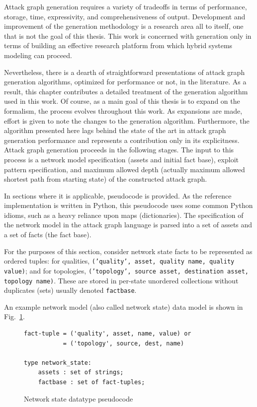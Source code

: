 Attack graph generation requires a variety of tradeoffs in terms of performance,
storage, time, expressivity, and comprehensiveness of output. Development and
improvement of the generation methodology is a research area all to itself, one
that is not the goal of this thesis. This work is concerned with generation only
in terms of building an effective research platform from which hybrid systems
modeling can proceed.

Nevertheless, there is a dearth of straightforward presentations of attack 
graph generation algorithms, optimized for performance or not, in the 
literature. As a result, this chapter contributes a detailed treatment of the
generation algorithm used in this work. Of course, as a main goal of this
thesis is to expand on the formalism, the process evolves throughout this
work. As expansions are made, effort is given to note the changes to the
generation algorithm. Furthermore, the algorithm presented here lags behind the
state of the art in attack graph generation performance and represents a
contribution only in its explicitness.
Attack graph generation proceeds in the following stages. The input to this
process is a network model specification (assets and initial fact base),
exploit pattern specification, and maximum allowed depth (actually maximum
allowed shortest path from starting state) of the constructed attack graph.

In sections where it is applicable, pseudocode is provided. As the reference
implementation is written in Python, this pseudocode uses some common Python
idioms, such as a heavy reliance upon maps (dictionaries).
The specification of the network model in the attack graph language is
parsed into a set of assets and a set of facts (the fact base). 

For the purposes
of this section, consider network state facts to be represented as ordered
tuples: for qualities, \texttt{('quality', asset, quality name, quality value)};
and for topologies, \texttt{('topology', source asset, destination asset,
topology name)}. These are stored in per-state unordered collections without duplicates
(sets) usually denoted \texttt{factbase}.

An example network model (also called network state) data model is shown in
Fig.~\ref{fig:netstate_pc}.

\begin{figure}
\begin{lstlisting}
fact-tuple = ('quality', asset, name, value) or
           = ('topology', source, dest, name)

type network_state:
    assets : set of strings;
    factbase : set of fact-tuples;
\end{lstlisting}
\label{fig:netstate_pc}
\caption{Network state datatype pseudocode}
\end{figure}

